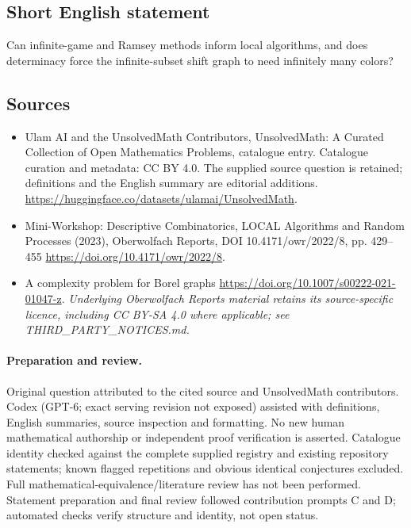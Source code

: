 \documentclass[11pt]{article}
\begin{document}
\subsection{Short English statement}
Can infinite-game and Ramsey methods inform local algorithms, and does determinacy force the infinite-subset shift graph to need infinitely many colors?
\subsection{Sources}
\begin{itemize}
\item[\hypertarget{source:statement:1}{S1}] Ulam AI and the UnsolvedMath Contributors, UnsolvedMath: A Curated Collection of Open Mathematics Problems, catalogue entry. Catalogue curation and metadata: CC BY 4.0. The supplied source question is retained; definitions and the English summary are editorial additions.
\url{https://huggingface.co/datasets/ulamai/UnsolvedMath}.
\item[\hypertarget{source:statement:2}{S2}] Mini-Workshop: Descriptive Combinatorics, LOCAL Algorithms and Random Processes (2023), Oberwolfach Reports, DOI 10.4171/owr/2022/8, pp. 429--455
\url{https://doi.org/10.4171/owr/2022/8}.
\item[\hypertarget{source:statement:3}{S3}] A complexity problem for Borel graphs
\url{https://doi.org/10.1007/s00222-021-01047-z}.
\textit{Underlying Oberwolfach Reports material retains its source-specific licence, including CC BY-SA 4.0 where applicable; see THIRD\_PARTY\_NOTICES.md.}
\end{itemize}
\paragraph{Preparation and review.}
Original question attributed to the cited source and UnsolvedMath contributors. Codex (GPT-6; exact serving revision not exposed) assisted with definitions, English summaries, source inspection and formatting. No new human mathematical authorship or independent proof verification is asserted. Catalogue identity checked against the complete supplied registry and existing repository statements; known flagged repetitions and obvious identical conjectures excluded. Full mathematical-equivalence/literature review has not been performed. Statement preparation and final review followed contribution prompts C and D; automated checks verify structure and identity, not open status.
\label{end:statement}
\end{document}
